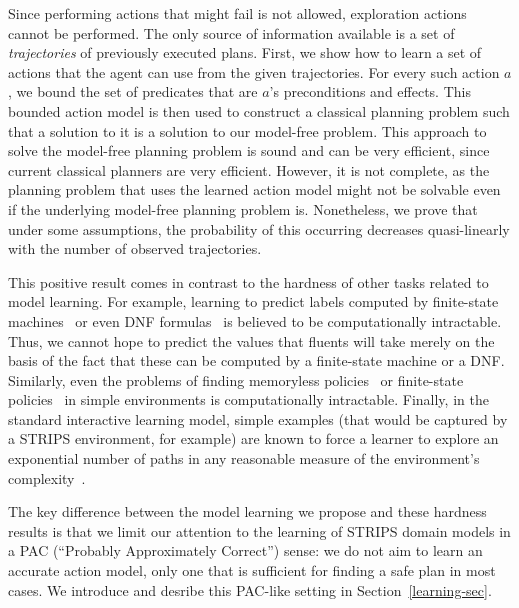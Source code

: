 \documentclass{article}
\newcommand{\roni}[1]{[[Roni:#1]]}
\begin{document}
	
	Since performing actions that might fail is not allowed, exploration actions 
	cannot be performed. The only source of information available is a set of 
	{\em trajectories} of previously executed plans. 
	First, we show how to learn a set of actions that the agent can use from the given trajectories. 
	For every such action $a$, we bound the set of predicates that are $a$'s preconditions and effects. This bounded action model is then used  to construct a classical planning problem such that a solution to it is a solution to our model-free problem. This approach to solve the model-free planning problem 
	is sound and can be very efficient, since current classical planners are very efficient.   
	However, it is not complete, as the planning problem that uses the learned action model might not be solvable even if the underlying model-free planning problem is. 
	Nonetheless, we prove that under some assumptions, the probability of this occurring decreases quasi-linearly with the number of observed trajectories. 
	
	
	
	This positive result comes in contrast to the hardness of other tasks related to model learning. 
	For example, learning to predict labels computed by finite-state machines~\cite{kearns1994} or even DNF formulas~\cite{daniely2016} is believed to be computationally intractable. Thus, we cannot hope to predict the values that fluents will take merely on the basis of the fact that these can be computed by a finite-state machine or a DNF. 
		Similarly, even the problems of finding memoryless policies~\cite{littman1994} or finite-state policies~\cite{meuleau1999} in simple environments is computationally intractable. Finally, in the standard interactive learning model, simple examples (that would be captured by a STRIPS environment, for example) are known to force a learner to explore an exponential number of paths in any reasonable measure of the environment's complexity~\cite[Section 8.6]{kakade2003}.
		

The key difference between the model learning we propose and these hardness results is that we limit our attention to the learning of STRIPS domain models in a PAC (``Probably Approximately Correct'') sense: we do not aim to learn an accurate action model, only one that is sufficient for finding a safe plan in most cases. We introduce and desribe this PAC-like setting in Section~\ref{learning-sec}.%
	 
\end{document}
